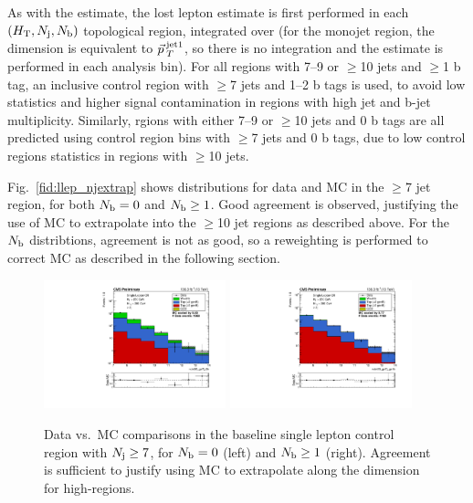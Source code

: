 As with the \znunu estimate,
the lost lepton estimate is first performed in each $(H_{\mathrm{T}},N_{\mathrm{j}},N_{\mathrm{b}})$ topological region, integrated
over \mttwo (for the monojet region, the \Ht dimension is equivalent to $\vec{p}_{\> T}^{\> \mathrm{jet1}}$,
so there is no integration and the estimate is performed in each analysis bin). For all regions
with 7--9 or $\geq$10 jets and $\geq$1 b tag, an inclusive control region with $\geq$7 jets and 1--2 b tags
is used, to avoid low statistics and higher signal contamination in regions with high jet and b-jet multiplicity.
Similarly, rgions with either 7--9 or $\geq$10 jets and 0 b tags are all predicted using control region bins
with $\geq$7 jets and 0 b tags, due to low control regions statistics in regions with $\geq$10 jets.

Fig.~\ref{fid:llep_njextrap} shows \Nj distributions for data and MC in the $\geq$7 jet region, for both $N_{\mathrm{b}}=0$
and $N_{\mathrm{b}}\geq1$. Good agreement is observed, justifying the use of MC to extrapolate into the $\geq$10 jet regions
as described above. For the $N_{\mathrm{b}}$ distribtions, agreement is not as good, so a reweighting is performed to correct
MC as described in the following section.

\begin{figure}[ht]
  \begin{center}
    \includegraphics[width=0.47\textwidth]{figs/llep/crslbase_nJet30_ge7j_0b.pdf}
    \includegraphics[width=0.47\textwidth]{figs/llep/crslbase_nJet30_ge7j_ge1b.pdf}
    \caption{Data vs.\ MC \Nj comparisons in the baseline single lepton control region with $N_{\mathrm{j}}\geq7$,
      for $N_{\mathrm{b}}=0$ (left) and $N_{\mathrm{b}}\geq1$ (right). Agreement is sufficient to justify using MC to extrapolate
      along the \Nj dimension for high-\Nj regions.
            }
    \label{fig:llep_njextrap}
  \end{center}
\end{figure}

